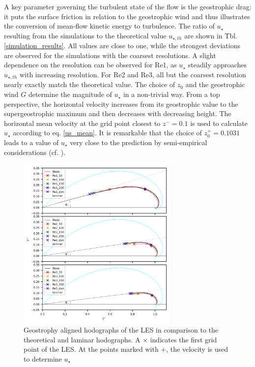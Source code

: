 \documentclass[draft,a4paper,11pt]{article}
\begin{document}
A key parameter governing the turbulent state of the flow is the geostrophic drag: it puts the surface friction in relation to the geostrophic wind and thus illustrates the conversion of mean-flow kinetic energy to turbulence. The ratio of $u_{\star}$ resulting from the simulations to the theoretical value $u_{\star,th}$ are shown in Tbl. \ref{simulation_results}. All values are close to one, while the strongest deviations are observed for the simulations with the coarsest resolutions. A slight dependence on the resolution can be observed for Re1, as $u_\star$ steadily approaches $u_{\star,th}$ with increasing resolution. For Re2 and Re3, all but the coarsest resolution nearly exactly match the theoretical value. The choice of $z_0$ and the geostrophic wind $G$ determine the magnitude of $u_\star$ in a non-trivial way. From a top perspective, the horizontal velocity increases from its geostrophic value to the supergeostrophic maximum and then decreases with decreasing height. The horizontal mean velocity at the grid point closest to $z^-=0.1$ is used to calculate $u_\star$ according to eq. \ref{us_mean}. It is remarkable that the choice of $z_0^+=0.1031$ leads to a value of $u_{\star}$ very close to the prediction by semi-empirical considerations (cf. \cite{spalart1989theoretical}).

\begin{figure}[ht]
	\centering
	\includegraphics[width=0.7\textwidth]{figures_2024/d3y_3Re_hodograph}
  \caption{Geostrophy aligned hodographs of the LES in comparison to the theoretical and laminar hodographs. A $\times$ indicates the first grid point of the LES. At the points marked with $+$, the velocity is used to determine $u_\star$}
  \label{3Re_hodograph}
\end{figure}
\end{document}
